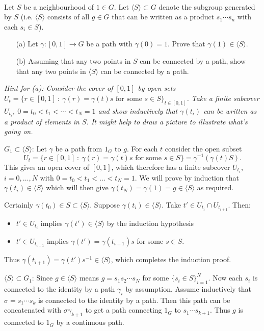 \documentclass[12pt]{article}
\begin{document}
\begin{question}\ \\
Let $S$ be a neighbourhood of $1\in G$. Let $\langle S\rangle\subset G$ denote the subgroup generated by $S$ (i.e. $\langle S\rangle$ consists of all $g\in G$ that can be written as a product $s_1\cdots s_n$ with each $s_i\in S$).
\begin{enumerate}
\item[(a)] Let $\gamma\colon[0,1]\to G$ be a path with $\gamma(0)=1$. Prove that $\gamma(1)\in\langle S\rangle$.
\item[(b)] Assuming that any two points in $S$ can be connected by a path, show that any two points in $\langle S\rangle$ can be connected by a path.
\end{enumerate}

{\em Hint for (a): Consider the cover of $[0,1]$ by open sets $U_t=\{r\in [0,1]\ :\ \gamma(r)=\gamma(t)s\mbox{ for some }s\in S\}_{t\in[0,1]}$. Take a finite subcover $U_{t_i}$, $0=t_0<t_1<\cdots<t_N=1$ and show inductively that $\gamma(t_i)$ can be written as a product of elements in $S$. It might help to draw a picture to illustrate what's going on.}
\end{question}

\begin{answer}
$G_1\subset\langle S\rangle$: Let $\gamma$ be a path from $1_G$ to $g$. For each $t$ consider the open subset
\[U_t=\{r\in [0,1]\ :\ \gamma(r)=\gamma(t)s\mbox{ for some }s\in S\}=\gamma^{-1}(\gamma(t)S).\]
This gives an open cover of $[0,1]$, which therefore has a finite subcover $U_{t_i}$, $i=0,\ldots,N$ with $0=t_0<t_1<\ldots<t_N=1$. We will prove by induction that $\gamma(t_i)\in \langle S\rangle$ which will then give $\gamma(t_N)=\gamma(1)=g\in \langle S\rangle$ as required.

Certainly $\gamma(t_0)\in S\subset\langle S\rangle$. Suppose $\gamma(t_i)\in\langle S\rangle$. Take $t'\in U_{t_i}\cap U_{t_{i+1}}$. Then:
\begin{itemize}
\item $t'\in U_{t_i}$ implies $\gamma(t')\in\langle S\rangle$ by the induction hypothesis
\item $t'\in U_{t_{i+1}}$ implies $\gamma(t')=\gamma(t_{i+1})s$ for some $s\in S$.
\end{itemize}
Thus $\gamma(t_{i+1})=\gamma(t')s^{-1}\in\langle S\rangle$, which completes the induction proof.

$\langle S\rangle\subset G_1$: Since $g\in \langle S\rangle$ means $g=s_1s_2\cdots s_N$ for some $\{s_i\in S\}_{i=1}^N$. Now each $s_i$ is connected to the identity by a path $\gamma_i$ by assumption. Assume inductively that $\sigma=s_1\cdots s_k$ is connected to the identity by a path. Then this path can be concatenated with $\sigma\gamma_{k+1}$ to get a path connecting $1_G$ to $s_1\cdots s_{k+1}$. Thus $g$ is connected to $1_G$ by a continuous path.
\end{answer}
\end{document}
